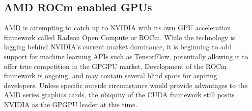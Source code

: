 \documentclass[onecolumn, draftclsnofoot,10pt, compsoc]{IEEEtran}
\begin{document}
    \subsection{AMD ROCm enabled GPUs}
    AMD is attempting to catch up to NVIDIA with its own GPU acceleration framework called Radeon Open Compute or ROCm. While the technology is lagging behind NVIDIA’s current market dominance, it is beginning to add support for machine learning APIs such as TensorFlow, potentially allowing it to offer true competition in the GPGPU market. Development of the ROCm framework is ongoing, and may contain several blind spots for aspiring developers. Unless specific outside circumstance would provide advantages to the AMD series graphics cards, the ubiquity of the CUDA framework still posits NVIDIA as the GPGPU leader at this time.
    
\end{document}
